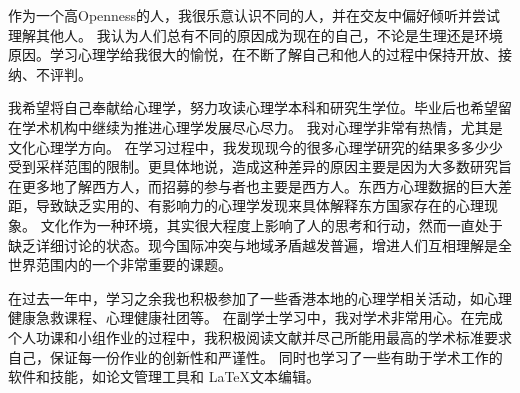 \documentclass{article}
\begin{document}


作为一个高Openness的人，我很乐意认识不同的人，并在交友中偏好倾听并尝试理解其他人。
我认为人们总有不同的原因成为现在的自己，不论是生理还是环境原因。学习心理学给我很大的愉悦，在不断了解自己和他人的过程中保持开放、接纳、不评判。


我希望将自己奉献给心理学，努力攻读心理学本科和研究生学位。毕业后也希望留在学术机构中继续为推进心理学发展尽心尽力。
我对心理学非常有热情，尤其是文化心理学方向。
在学习过程中，我发现现今的很多心理学研究的结果多多少少受到采样范围的限制。更具体地说，造成这种差异的原因主要是因为大多数研究旨在更多地了解西方人，而招募的参与者也主要是西方人。东西方心理数据的巨大差距，导致缺乏实用的、有影响力的心理学发现来具体解释东方国家存在的心理现象。
文化作为一种环境，其实很大程度上影响了人的思考和行动，然而一直处于缺乏详细讨论的状态。现今国际冲突与地域矛盾越发普遍，增进人们互相理解是全世界范围内的一个非常重要的课题。


在过去一年中，学习之余我也积极参加了一些香港本地的心理学相关活动，如心理健康急救课程、心理健康社团等。
在副学士学习中，我对学术非常用心。在完成个人功课和小组作业的过程中，我积极阅读文献并尽己所能用最高的学术标准要求自己，保证每一份作业的创新性和严谨性。
同时也学习了一些有助于学术工作的软件和技能，如论文管理工具和 \LaTeX 文本编辑。

\end{document}
